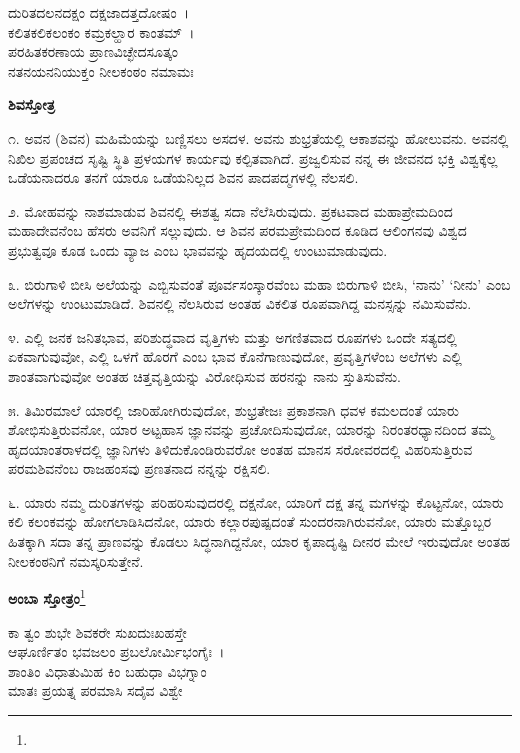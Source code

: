 
\begin{myquote}
ದುರಿತದಲನದಕ್ಷಂ ದಕ್ಷಜಾದತ್ತದೋಷಂ~।\\ಕಲಿತಕಲಿಕಲಂಕಂ ಕಮ್ರಕಲ್ಹಾರ ಕಾಂತಮ್~।\\ಪರಹಿತಕರಣಾಯ ಪ್ರಾಣವಿಚ್ಛೇದಸೂತ್ಕಂ\\ನತನಯನನಿಯುಕ್ತಂ ನೀಲಕಂಠಂ ನಮಾಮಃ
\end{myquote}


\begin{center}
\textbf{ಶಿವಸ್ತೋತ್ರ}
\end{center}

೧. ಅವನ (ಶಿವನ) ಮಹಿಮೆಯನ್ನು ಬಣ್ಣಿಸಲು ಅಸದಳ. ಅವನು ಶುಭ್ರತೆಯಲ್ಲಿ ಆಕಾಶವನ್ನು ಹೋಲುವನು. ಅವನಲ್ಲಿ ನಿಖಿಲ ಪ್ರಪಂಚದ ಸೃಷ್ಟಿ ಸ್ಥಿತಿ ಪ್ರಳಯಗಳ ಕಾರ್ಯವು ಕಲ್ಪಿತವಾಗಿದೆ. ಪ್ರಜ್ವಲಿಸುವ ನನ್ನ ಈ ಜೀವನದ ಭಕ್ತಿ ವಿಶ್ವಕ್ಕೆಲ್ಲ ಒಡೆಯನಾದರೂ ತನಗೆ ಯಾರೂ ಒಡೆಯನಿಲ್ಲದ ಶಿವನ ಪಾದಪದ್ಮಗಳಲ್ಲಿ ನೆಲಸಲಿ.

೨. ಮೋಹವನ್ನು ನಾಶಮಾಡುವ ಶಿವನಲ್ಲಿ ಈಶತ್ವ ಸದಾ ನೆಲೆಸಿರುವುದು. ಪ್ರಕಟವಾದ ಮಹಾಪ್ರೇಮದಿಂದ ಮಹಾದೇವನೆಂಬ ಹೆಸರು ಅವನಿಗೆ ಸಲ್ಲುವುದು. ಆ ಶಿವನ ಪರಮಪ್ರೇಮದಿಂದ ಕೂಡಿದ ಆಲಿಂಗನವು ವಿಶ್ವದ ಪ್ರಭುತ್ವವೂ ಕೂಡ ಒಂದು ವ್ಯಾಜ ಎಂಬ ಭಾವವನ್ನು ಹೃದಯದಲ್ಲಿ ಉಂಟುಮಾಡುವುದು.

೩. ಬಿರುಗಾಳಿ ಬೀಸಿ ಅಲೆಯನ್ನು ಎಬ್ಬಿಸುವಂತೆ ಪೂರ್ವಸಂಸ್ಕಾರವೆಂಬ ಮಹಾ ಬಿರುಗಾಳಿ ಬೀಸಿ, ‘ನಾನು’ ‘ನೀನು’ ಎಂಬ ಅಲೆಗಳನ್ನು ಉಂಟುಮಾಡಿದೆ. ಶಿವನಲ್ಲಿ ನೆಲಸಿರುವ ಅಂತಹ ವಿಕಲಿತ ರೂಪವಾಗಿದ್ದ ಮನಸ್ಸನ್ನು ನಮಿಸುವೆನು.

೪. ಎಲ್ಲಿ ಜನಕ ಜನಿತಭಾವ, ಪರಿಶುದ್ಧವಾದ ವೃತ್ತಿಗಳು ಮತ್ತು ಅಗಣಿತವಾದ ರೂಪಗಳು ಒಂದೇ ಸತ್ಯದಲ್ಲಿ ಏಕವಾಗುವುವೋ, ಎಲ್ಲಿ ಒಳಗೆ ಹೊರಗೆ ಎಂಬ ಭಾವ ಕೊನೆಗಾಣುವುದೋ, ಪ್ರವೃತ್ತಿಗಳೆಂಬ ಅಲೆಗಳು ಎಲ್ಲಿ ಶಾಂತವಾಗುವುವೋ ಅಂತಹ ಚಿತ್ತವೃತ್ತಿಯನ್ನು ವಿರೋಧಿಸುವ ಹರನನ್ನು ನಾನು ಸ್ತುತಿಸುವೆನು.

೫. ತಿಮಿರಮಾಲೆ ಯಾರಲ್ಲಿ ಜಾರಿಹೋಗಿರುವುದೋ, ಶುಭ್ರತೇಜಃ ಪ್ರಕಾಶನಾಗಿ ಧವಳ ಕಮಲದಂತೆ ಯಾರು ಶೋಭಿಸುತ್ತಿರುವನೋ, ಯಾರ ಅಟ್ಟಹಾಸ ಜ್ಞಾನವನ್ನು ಪ್ರಚೋದಿಸುವುದೋ, ಯಾರನ್ನು ನಿರಂತರಧ್ಯಾನದಿಂದ ತಮ್ಮ ಹೃದಯಾಂತರಾಳದಲ್ಲಿ ಜ್ಞಾನಿಗಳು ತಿಳಿದುಕೊಂಡಿರುವರೋ ಅಂತಹ ಮಾನಸ ಸರೋವರದಲ್ಲಿ ವಿಹರಿಸುತ್ತಿರುವ ಪರಮಶಿವನೆಂಬ ರಾಜಹಂಸವು ಪ್ರಣತನಾದ ನನ್ನನ್ನು ರಕ್ಷಿಸಲಿ.

೬. ಯಾರು ನಮ್ಮ ದುರಿತಗಳನ್ನು ಪರಿಹರಿಸುವುದರಲ್ಲಿ ದಕ್ಷನೋ, ಯಾರಿಗೆ ದಕ್ಷ ತನ್ನ ಮಗಳನ್ನು ಕೊಟ್ಟನೋ, ಯಾರು ಕಲಿ ಕಲಂಕವನ್ನು ಹೋಗಲಾಡಿಸಿದನೋ, ಯಾರು ಕಲ್ಲಾರಪುಷ್ಪದಂತೆ ಸುಂದರನಾಗಿರುವನೋ, ಯಾರು ಮತ್ತೊಬ್ಬರ ಹಿತಕ್ಕಾಗಿ ಸದಾ ತನ್ನ ಪ್ರಾಣವನ್ನು ಕೊಡಲು ಸಿದ್ಧನಾಗಿದ್ದನೋ, ಯಾರ ಕೃಪಾದೃಷ್ಟಿ ದೀನರ ಮೇಲೆ ಇರುವುದೋ ಅಂತಹ ನೀಲಕಂಠನಿಗೆ ನಮಸ್ಕರಿಸುತ್ತೇನೆ.

\begin{center}
\textbf{ಅಂಬಾ ಸ್ತೋತ್ರಂ}\footnote{}
\end{center}

\begin{myquote}
ಕಾ ತ್ವಂ ಶುಭೇ ಶಿವಕರೇ ಸುಖದುಃಖಹಸ್ತೇ\\ಆಘೂರ್ಣಿತಂ ಭವಜಲಂ ಪ್ರಬಲೋರ್ಮಿಭಂಗೈಃ~।\\ಶಾಂತಿಂ ವಿಧಾತುಮಿಹ ಕಿಂ ಬಹುಧಾ ವಿಭಗ್ನಾಂ\\
ಮಾತಃ ಪ್ರಯತ್ನ ಪರಮಾಸಿ ಸದೈವ ವಿಶ್ವೇ
\end{myquote}

